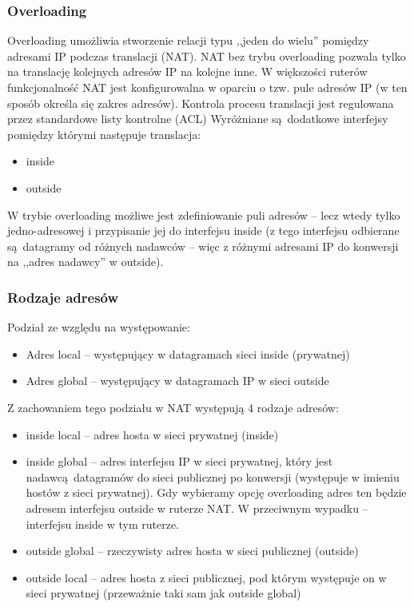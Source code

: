 \documentclass[a4paper, 12pt, titlepage]{article}
\begin{document}
			\subsubsection{Overloading}
				Overloading umożliwia stworzenie relacji typu ,,jeden do wielu'' pomiędzy adresami IP podczas translacji (NAT). NAT bez trybu overloading pozwala tylko na translację kolejnych adresów IP na kolejne inne.
				\newline
				\newline
				W większości ruterów funkcjonalność NAT jest konfigurowalna w oparciu o tzw. pule adresów IP (w ten sposób określa się zakres adresów). Kontrola procesu translacji jest regulowana przez standardowe listy kontrolne (ACL)
				\newline
				\newline
				Wyróżniane są dodatkowe interfejsy pomiędzy którymi następuje translacja:
				\begin{itemize}
					\item inside
					\item outside
				\end{itemize}
				W trybie overloading możliwe jest zdefiniowanie puli adresów -- lecz wtedy tylko jedno-adresowej i przypisanie jej do interfejsu inside (z tego interfejsu odbierane są datagramy od różnych nadawców -- więc z różnymi adresami IP do konwersji na ,,adres nadawcy'' w outside).
			\subsubsection{Rodzaje adresów}
				Podział ze względu na występowanie:
				\begin{itemize}
					\item Adres local -- występujący w datagramach sieci inside (prywatnej)
					\item Adres global -- występujący w datagramach IP w sieci outside
				\end{itemize}
				Z zachowaniem tego podziału w NAT występują 4 rodzaje adresów:
				\begin{itemize}
					\item inside local -- adres hosta w sieci prywatnej (inside)
					\item inside global -- adres interfejsu IP w sieci prywatnej, który jest nadawcą datagramów do sieci publicznej po konwersji (występuje w imieniu hostów z sieci prywatnej). Gdy wybieramy opcję overloading adres ten będzie adresem interfejsu outside w ruterze NAT. W przeciwnym wypadku -- interfejsu inside w tym ruterze. 
					\item outside global -- rzeczywisty adres hosta w sieci publicznej (outside)
					\item outside local -- adres hosta z sieci publicznej, pod którym występuje on w sieci prywatnej (przeważnie taki sam jak outside global)
				\end{itemize}
\end{document}
